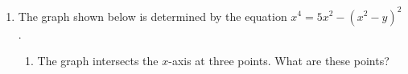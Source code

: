 \documentclass{article}
\begin{document}
\begin{enumerate}







\item 
  \label{spring2012-mb-midterm1-implicit-differentiation}

  The graph shown below is determined by the equation $x^4=5x^2-(x^2 -
  y)^2$.

  \begin{enumerate}
  \item
    \begin{problem}
      The graph intersects the $x$-axis at three points.  What are these
      points?
    \end{problem}


\end{enumerate}
\end{enumerate}
\end{document}
